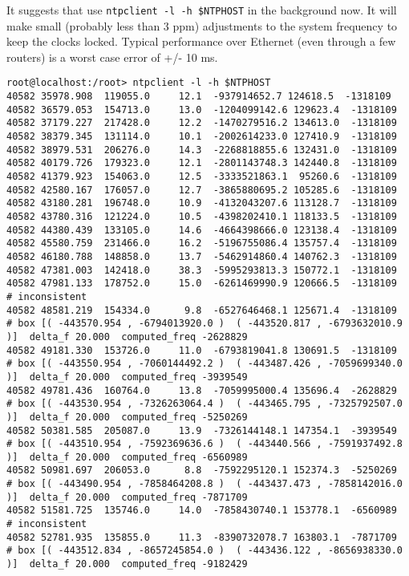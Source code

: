 \documentclass[a4paper]{report}
\begin{document}
\begin{enumerate}
It suggests that use {\tt ntpclient -l -h \$NTPHOST} in the background now.
It will make small (probably less than 3 ppm) adjustments to the system 
frequency to keep the clocks locked. Typical performance over Ethernet 
(even through a few routers) is a worst case error of +/- 10 ms.
\begin{lstlisting}
root@localhost:/root> ntpclient -l -h $NTPHOST
40582 35978.908  119055.0     12.1  -937914652.7 124618.5  -1318109
40582 36579.053  154713.0     13.0  -1204099142.6 129623.4  -1318109
40582 37179.227  217428.0     12.2  -1470279516.2 134613.0  -1318109
40582 38379.345  131114.0     10.1  -2002614233.0 127410.9  -1318109
40582 38979.531  206276.0     14.3  -2268818855.6 132431.0  -1318109
40582 40179.726  179323.0     12.1  -2801143748.3 142440.8  -1318109
40582 41379.923  154063.0     12.5  -3333521863.1  95260.6  -1318109
40582 42580.167  176057.0     12.7  -3865880695.2 105285.6  -1318109
40582 43180.281  196748.0     10.9  -4132043207.6 113128.7  -1318109
40582 43780.316  121224.0     10.5  -4398202410.1 118133.5  -1318109
40582 44380.439  133105.0     14.6  -4664398666.0 123138.4  -1318109
40582 45580.759  231466.0     16.2  -5196755086.4 135757.4  -1318109
40582 46180.788  148858.0     13.7  -5462914860.4 140762.3  -1318109
40582 47381.003  142418.0     38.3  -5995293813.3 150772.1  -1318109
40582 47981.133  178752.0     15.0  -6261469990.9 120666.5  -1318109
# inconsistent
40582 48581.219  154334.0      9.8  -6527646468.1 125671.4  -1318109
# box [( -443570.954 , -6794013920.0 )  ( -443520.817 , -6793632010.9 )]  delta_f 20.000  computed_freq -2628829
40582 49181.330  153726.0     11.0  -6793819041.8 130691.5  -1318109
# box [( -443550.954 , -7060144492.2 )  ( -443487.426 , -7059699340.0 )]  delta_f 20.000  computed_freq -3939549
40582 49781.436  160764.0     13.8  -7059995000.4 135696.4  -2628829
# box [( -443530.954 , -7326263064.4 )  ( -443465.795 , -7325792507.0 )]  delta_f 20.000  computed_freq -5250269
40582 50381.585  205087.0     13.9  -7326144148.1 147354.1  -3939549
# box [( -443510.954 , -7592369636.6 )  ( -443440.566 , -7591937492.8 )]  delta_f 20.000  computed_freq -6560989
40582 50981.697  206053.0      8.8  -7592295120.1 152374.3  -5250269
# box [( -443490.954 , -7858464208.8 )  ( -443437.473 , -7858142016.0 )]  delta_f 20.000  computed_freq -7871709
40582 51581.725  135746.0     14.0  -7858430740.1 153778.1  -6560989
# inconsistent
40582 52781.935  135855.0     11.3  -8390732078.7 163803.1  -7871709
# box [( -443512.834 , -8657245854.0 )  ( -443436.122 , -8656938330.0 )]  delta_f 20.000  computed_freq -9182429

\end{lstlisting}
\end{enumerate}
\end{document}
